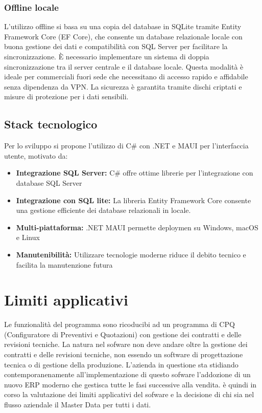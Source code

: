 \documentclass[12pt, a4paper]{article}
\begin{document}
\subsubsection{Offline locale}

L'utilizzo offline si basa su una copia del database in SQLite tramite Entity Framework Core (EF Core)\cite{EFCore}, che consente un database relazionale locale con buona gestione dei dati e compatibilità con SQL Server per facilitare la sincronizzazione.
È necessario implementare un sistema di doppia sincronizzazione tra il server centrale e il database locale.
Questa modalità è ideale per commerciali fuori sede che necessitano di accesso rapido e affidabile senza dipendenza da VPN.
La sicurezza è garantita tramite dischi criptati e misure di protezione per i dati sensibili.

\subsection{Stack tecnologico}

Per lo sviluppo si propone l'utilizzo di C\# con \@.NET e MAUI per l'interfaccia utente, motivato da:

\begin{itemize}
      \item \textbf{Integrazione SQL Server:} C\# offre ottime librerie per l'integrazione con database SQL Server
      \item \textbf{Integrazione con SQL lite:} La libreria Entity Framework Core consente una gestione efficiente dei database relazionali in locale.
      \item \textbf{Multi-piattaforma:} \@.NET MAUI permette deploymen su Windows, macOS e Linux
      \item \textbf{Manutenibilità:} Utilizzare tecnologie moderne riduce il debito tecnico e facilita la manutenzione futura
\end{itemize}

\section{Limiti applicativi}
Le funzionalità del programma sono ricoducibi ad un programma di CPQ (Configuratore di Preventivi e Quotazioni)
con gestione dei contratti e delle revisioni tecniche.
La natura nel sofware non deve andare oltre la gestione dei contratti e delle revisioni tecniche,
non essendo un software di progettazione tecnica o di gestione della produzione.
L'azienda in questione sta stidiando contemporanenamente all'implementazione di questo sofware l'addozione di un
nuovo ERP moderno che gestisca tutte le fasi successive alla vendita.
è quindi in corso la valutazione dei limiti applicativi del sofware e la decisione di chi sia 
nel flusso aziendale il Master Data per tutti i dati.
\end{document}
